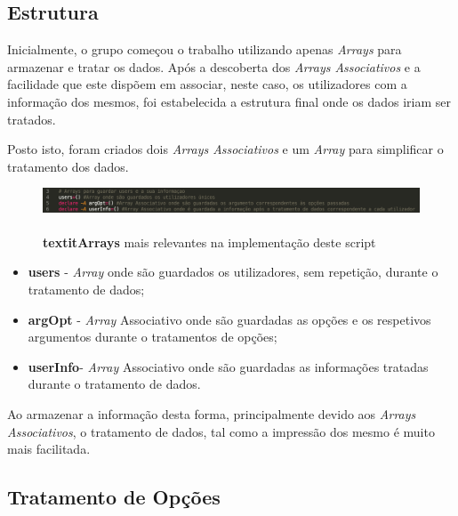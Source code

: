 \documentclass[10pt,portuguese]{article}
\begin{document}
\subsection{Estrutura}
\par Inicialmente, o grupo começou o trabalho utilizando apenas \textit{Arrays} para armazenar e tratar os dados. Após a descoberta dos \textit{Arrays Associativos} e a facilidade que este dispõem em associar, neste caso, os utilizadores com a informação dos mesmos, foi estabelecida a estrutura final onde os dados iriam ser tratados.
\par Posto isto, foram criados dois \textit{Arrays Associativos} e um \textit{Array} para simplificar o tratamento dos dados.

\begin{figure}[!h]
    \centering
    \includegraphics[width=\textwidth]{estrutura.png}
    \caption{\textbf{\\textit{Arrays}} mais relevantes na implementação deste script}
\end{figure}
\newline
 \begin{itemize}
   \item {\textbf{users}}   - \textit{Array} onde são guardados os utilizadores, sem repetição, durante o tratamento de dados;
   \\
   \item {\textbf{argOpt}}  - \textit{Array} Associativo onde são guardadas as opções e os respetivos argumentos durante o tratamentos de opções;
   \\
   \item {\textbf{userInfo}}- \textit{Array} Associativo onde são guardadas as informações tratadas durante o tratamento de dados.
 \end{itemize}
\newline
 \par Ao armazenar a informação desta forma, principalmente devido aos \textit{Arrays Associativos}, o tratamento de dados, tal como a impressão dos mesmo é muito mais facilitada.

\clearpage

\subsection{Tratamento de Opções}
\end{document}

